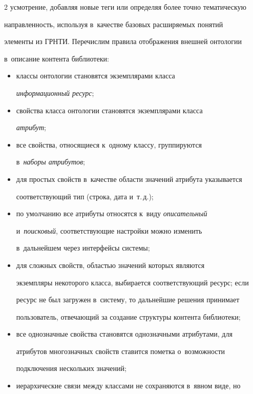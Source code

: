 \begin{multicols}{2}
усмотрение, добавляя новые теги или определяя более точно тематическую 

направленность, используя в~качестве базовых расширяемых понятий 

элементы из ГРНТИ. Перечислим правила отоб\-ра\-же\-ния внешней онтологии 

в~описание контента библиотеки:

    \begin{itemize}

\item классы онтологии становятся экземплярами класса 

\textit{информационный ресурс};

\item свойства класса онтологии становятся экземплярами класса 

\textit{атрибут};

\item все свойства, относящиеся к~одному классу, группируются 

в~\textit{наборы атрибутов};

\item для простых свойств в~качестве области значений атрибута указывается 

соответствующий тип (строка, дата и~т.\,д.);

\item по умолчанию все атрибуты относятся к~виду \textit{описательный} 

и~\textit{поисковый}, соответствующие настройки можно изменить 

в~дальнейшем через интерфейсы системы;

\item для сложных свойств, областью значений которых являются 

экземпляры некоторого класса, выбирается соответствующий ресурс; если 

ресурс не был загружен в~систему, то дальнейшие решения принимает 

пользователь, отвечающий за создание структуры контента библиотеки;

\item все однозначные свойства становятся однозначными атрибутами, для 

атрибутов многозначных свойств ставится пометка о~воз\-мож\-ности 

подключения нескольких значений;

\item иерархические связи между классами не сохраняются в~явном виде, но 


\end{itemize}
\end{multicols}

